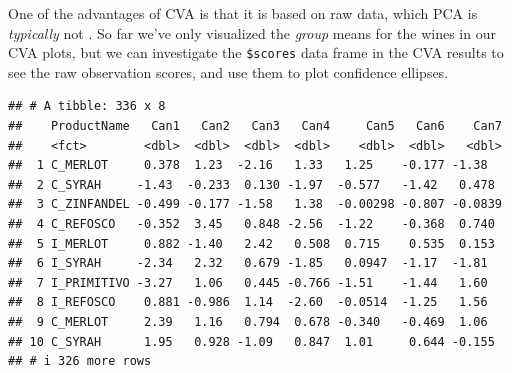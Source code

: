 \documentclass[
]{book}
\newenvironment{Shaded}{\begin{snugshade}}{\end{snugshade}}
\newcommand{\FunctionTok}[1]{\textcolor[rgb]{0.13,0.29,0.53}{\textbf{#1}}}
\newcommand{\NormalTok}[1]{#1}
\newcommand{\SpecialCharTok}[1]{\textcolor[rgb]{0.81,0.36,0.00}{\textbf{#1}}}
\begin{document}
One of the advantages of CVA is that it is based on raw data, which PCA is \emph{typically} not \citep[an exception is so-called Tucker-1 PCA,][]{dettmarPrincipal2020}. So far we've only visualized the \emph{group} means for the wines in our CVA plots, but we can investigate the \texttt{\$scores} data frame in the CVA results to see the raw observation scores, and use them to plot confidence ellipses.

\begin{Shaded}
\end{Shaded}

\begin{verbatim}
## # A tibble: 336 x 8
##    ProductName   Can1   Can2   Can3   Can4     Can5   Can6    Can7
##    <fct>        <dbl>  <dbl>  <dbl>  <dbl>    <dbl>  <dbl>   <dbl>
##  1 C_MERLOT     0.378  1.23  -2.16   1.33   1.25    -0.177 -1.38  
##  2 C_SYRAH     -1.43  -0.233  0.130 -1.97  -0.577   -1.42   0.478 
##  3 C_ZINFANDEL -0.499 -0.177 -1.58   1.38  -0.00298 -0.807 -0.0839
##  4 C_REFOSCO   -0.352  3.45   0.848 -2.56  -1.22    -0.368  0.740 
##  5 I_MERLOT     0.882 -1.40   2.42   0.508  0.715    0.535  0.153 
##  6 I_SYRAH     -2.34   2.32   0.679 -1.85   0.0947  -1.17  -1.81  
##  7 I_PRIMITIVO -3.27   1.06   0.445 -0.766 -1.51    -1.44   1.60  
##  8 I_REFOSCO    0.881 -0.986  1.14  -2.60  -0.0514  -1.25   1.56  
##  9 C_MERLOT     2.39   1.16   0.794  0.678 -0.340   -0.469  1.06  
## 10 C_SYRAH      1.95   0.928 -1.09   0.847  1.01     0.644 -0.155 
## # i 326 more rows
\end{verbatim}

\begin{Shaded}
\end{Shaded}
\end{document}
